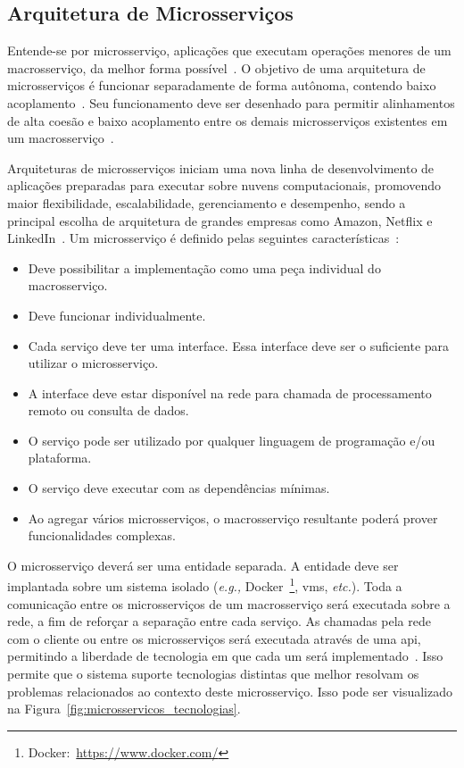 \subsection{Arquitetura de Microsserviços}
\label{sec:microsservicos}



Entende-se por microsserviço, aplicações que executam operações menores de um macrosserviço, da melhor forma possível~\cite{stephenclarkewillson2017, Newman2015Feb}.
%
O objetivo de uma arquitetura de microsserviços é funcionar separadamente de forma autônoma, contendo baixo acoplamento~\cite{Newman2015Feb}.
%
Seu funcionamento deve ser desenhado para permitir alinhamentos de alta coesão e baixo acoplamento entre os demais microsserviços existentes em um macrosserviço~\cite{8169955}.



Arquiteturas de microsserviços iniciam uma nova linha de desenvolvimento de aplicações preparadas para executar sobre nuvens computacionais, promovendo maior flexibilidade, escalabilidade, gerenciamento e desempenho, sendo a principal escolha de arquitetura de grandes empresas como Amazon, Netflix e LinkedIn~\cite{7830692,7515686}.
%
Um microsserviço é definido pelas seguintes características~\cite{8169955}:



\begin{itemize}
  \item Deve possibilitar a implementação como uma peça individual do macrosserviço.
  \item Deve funcionar individualmente.
  \item Cada serviço deve ter uma interface. Essa interface deve ser o suficiente para utilizar o microsserviço.
  \item A interface deve estar disponível na rede para chamada de processamento remoto ou consulta de dados.
  \item O serviço pode ser utilizado por qualquer linguagem de programação e/ou plataforma.
  \item O serviço deve executar com as dependências mínimas.
  \item Ao agregar vários microsserviços, o macrosserviço resultante poderá prover funcionalidades complexas.
\end{itemize}



O microsserviço deverá ser uma entidade separada.
%
A entidade deve ser implantada sobre um sistema isolado (\textit{e.g.,} Docker~\footnote{Docker:~\url{https://www.docker.com/}}, \acp{vm}, \textit{etc.}).
%
Toda a comunicação entre os microsserviços de um macrosserviço será executada sobre a rede, a fim de reforçar a separação entre cada serviço.
%
As chamadas pela rede com o cliente ou entre os microsserviços será executada através de uma \ac{api}, permitindo a liberdade de tecnologia em que cada um será implementado~\cite{Newman2015Feb}.
%
Isso permite que o sistema suporte tecnologias distintas que melhor resolvam os problemas relacionados ao contexto deste microsserviço.
%
Isso pode ser visualizado na Figura~\ref{fig:microsservicos_tecnologias}.



